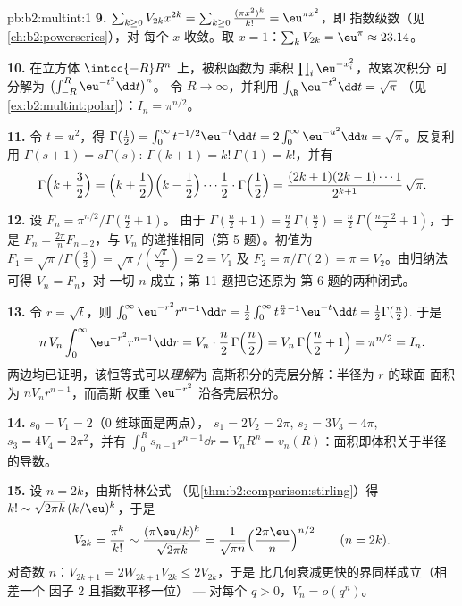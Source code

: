 \begin{solution}{pb:b2:multint:1}
\textbf{9.} $\sum_{k\geq0}V_{2k}x^{2k} =
\sum_{k\geq0}\frac{(\pi x^2)^k}{k!} = \eu^{\pi x^2}$，即
指数级数（见\cref{ch:b2:powerseries}），对
每个 $x$ 收敛。取 $x = 1$：$\sum_kV_{2k} = \eu^\pi \approx
23.14$。

\textbf{10.} 在立方体 $\intcc{-R}R^n$ 上，被积函数为
乘积 $\prod_i\eu^{-x_i^2}$，故累次积分
可分解为 $\bigl(\int_{-R}^R\eu^{-t^2}\dd t\bigr)^n$。
令 $R \to \infty$，并利用
$\int_\R\eu^{-t^2}\dd t = \sqrt\pi$
（见\cref{ex:b2:multint:polar}）：$I_n = \pi^{n/2}$。

\textbf{11.} 令 $t = u^2$，得 $\Gamma(\tfrac12) =
\int_0^\infty t^{-1/2}\eu^{-t}\dd t =
2\int_0^\infty\eu^{-u^2}\dd u = \sqrt\pi$。反复利用
$\Gamma(s+1) = s\Gamma(s)$: $\Gamma(k+1) = k!\,\Gamma(1) =
k!$，并有
\[
\Gamma\Bigl(k + \frac32\Bigr)
= \Bigl(k + \frac12\Bigr)\Bigl(k - \frac12\Bigr)\cdots
\frac12\cdot\Gamma\Bigl(\frac12\Bigr)
= \frac{(2k+1)(2k-1)\cdots1}{2^{k+1}}\,\sqrt\pi .
\]

\textbf{12.} 设 $F_n = \pi^{n/2}/\Gamma(\frac n2 + 1)$。
由于 $\Gamma(\frac n2 + 1) = \frac n2\,\Gamma(\frac n2) =
\frac n2\,\Gamma(\frac{n-2}2 + 1)$，于是 $F_n =
\frac{2\pi}nF_{n-2}$，与 $V_n$ 的递推相同（第
5 题）。初值为 $F_1 = \sqrt\pi/\Gamma(\frac32) =
\sqrt\pi/(\frac{\sqrt\pi}2) = 2 = V_1$ 及 $F_2 =
\pi/\Gamma(2) = \pi = V_2$。由归纳法可得 $V_n = F_n$，对
一切 $n$ 成立；第 11 题把它还原为
第 6 题的两种闭式。

\textbf{13.} 令 $r = \sqrt t$，则 $\int_0^\infty
\eu^{-r^2}r^{n-1}\dd r = \frac12\int_0^\infty
t^{\frac n2 - 1}\eu^{-t}\dd t = \frac12\Gamma(\frac n2)$.
于是
\[
n\,V_n\int_0^\infty\eu^{-r^2}r^{n-1}\dd r
= V_n\cdot\frac n2\,\Gamma\Bigl(\frac n2\Bigr)
= V_n\,\Gamma\Bigl(\frac n2 + 1\Bigr) = \pi^{n/2} = I_n .
\]
两边均已证明，该恒等式可以\emph{理解}为
高斯积分的壳层分解：半径为 $r$ 的球面
面积为 $nV_nr^{n-1}$，而高斯
权重 $\eu^{-r^2}$ 沿各壳层积分。

\textbf{14.} $s_0 = V_1 = 2$（$0$ 维球面是两点），
$s_1 = 2V_2 = 2\pi$, $s_2 = 3V_3 = 4\pi$, $s_3 = 4V_4 =
2\pi^2$，并有 $\int_0^R s_{n-1}r^{n-1}\dd r = V_nR^n =
v_n(R)$：面积即体积关于半径的导数。

\textbf{15.} 设 $n = 2k$，由斯特林公式
（见\cref{thm:b2:comparison:stirling}）得 $k! \sim
\sqrt{2\pi k}\,(k/\eu)^k$，于是
\[
V_{2k} = \frac{\pi^k}{k!}
\sim \frac{(\pi\eu/k)^k}{\sqrt{2\pi k}}
= \frac1{\sqrt{\pi n}}\Bigl(\frac{2\pi\eu}n\Bigr)^{n/2}
\qquad (n = 2k).
\]
对奇数 $n$：$V_{2k+1} = 2W_{2k+1}V_{2k} \leq 2V_{2k}$，于是
比几何衰减更快的界同样成立（相差一个
因子 $2$ 且指数平移一位） --- 对每个 $q >
0$，$V_n = o(q^n)$。


\end{solution}
